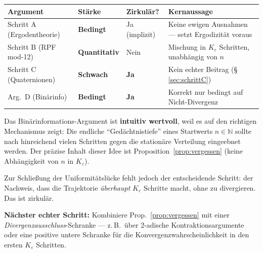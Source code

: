 \documentclass[12pt,a4paper]{article}
\newcommand{\N}{\mathbb{N}}
\begin{document}
\begin{tcolorbox}[bewmat, title={Vergleichende Einordnung der vier Argumente}]
\begin{center}
\renewcommand{\arraystretch}{1.5}
\begin{tabular}{>{\raggedright}p{2.0cm}
                >{\centering}p{2.2cm}
                >{\centering}p{1.8cm}
                >{\raggedright\arraybackslash}p{5.2cm}}
\toprule
\textbf{Argument} & \textbf{Stärke} & \textbf{Zirkulär?} & \textbf{Kernaussage} \\
\midrule
Schritt A (Ergodentheorie)
  & \textcolor{warnorange}{\bfseries Bedingt}
  & Ja (implizit)
  & Keine ewigen Ausnahmen --- setzt Ergodizität voraus \\[2pt]
Schritt B (RPF mod-12)
  & \textcolor{bewiesengrün}{\bfseries Quantitativ}
  & Nein
  & Mischung in $K_\varepsilon$ Schritten, unabhängig von $n$ \\[2pt]
Schritt C (Quaternionen)
  & \textcolor{lückenrot}{\bfseries Schwach}
  & \textbf{Ja}
  & Kein echter Beitrag (§\,\ref{sec:schrittC}) \\[2pt]
Arg.\ D (Binärinfo)
  & \textcolor{warnorange}{\bfseries Bedingt}
  & \textbf{Ja}
  & Korrekt nur bedingt auf Nicht-Divergenz \\
\bottomrule
\end{tabular}
\end{center}
\end{tcolorbox}

\begin{tcolorbox}[warnung, title={Fazit zu Argument D}]
Das Binärinformations-Argument ist \textbf{intuitiv wertvoll}, weil es auf
den richtigen Mechanismus zeigt: Die endliche ``Gedächtnistiefe'' eines
Startwerts $n \in \N$ sollte nach hinreichend vielen Schritten gegen die
stationäre Verteilung eingeebnet werden. Der präzise Inhalt dieser Idee
ist Proposition~\ref{prop:vergessen} (keine Abhängigkeit von $n$ in $K_\varepsilon$).

Zur Schließung der Uniformitätslücke fehlt jedoch der entscheidende Schritt:
der Nachweis, dass die Trajektorie \emph{überhaupt} $K_\varepsilon$ Schritte
macht, ohne zu divergieren. Das ist zirkulär.

\textbf{Nächster echter Schritt:} Kombiniere Prop.~\ref{prop:vergessen}
mit einer \emph{Divergenzausschluss}-Schranke --- z.\,B.\ über 2-adische
Kontraktionsargumente oder eine positive untere Schranke für die
Konvergenzwahrscheinlichkeit in den ersten $K_\varepsilon$ Schritten.
\end{tcolorbox}
\end{document}
